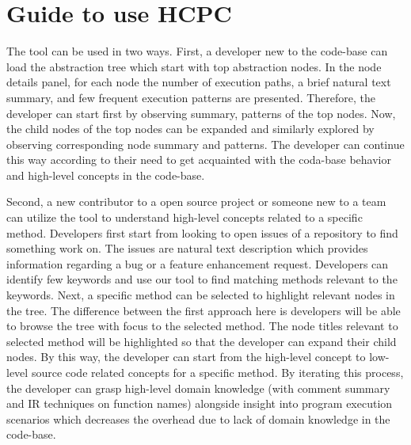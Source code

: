 \section{Guide to use HCPC}
\label{hla3:use_guide}
The tool can be used in two ways. First, a developer new to the code-base can load the abstraction tree which start with top abstraction  nodes. In the node details panel, for each node the number of execution paths, a brief natural text summary, and few frequent execution patterns are presented. Therefore, the developer can start first by observing summary, patterns of the top nodes. Now, the child nodes of the top nodes can be expanded and  similarly explored by observing corresponding node summary and patterns. The developer can continue this way according to their need to get acquainted with the coda-base behavior and high-level concepts in the code-base.

Second, a new contributor to a open source project or someone new to a team can utilize the tool to understand high-level concepts related to a specific method. Developers first start from looking to open issues of a repository to find something work on. The issues are natural text description which provides information regarding a bug or a feature enhancement request. Developers can identify few keywords and use our tool to find matching methods relevant to the keywords. Next, a specific method can be selected to highlight relevant nodes in the tree. The difference between the first approach here is developers will be able to browse the tree with focus to the selected method. The node titles relevant to selected method will be highlighted so that the developer can expand their child nodes. By this way, the developer can start from the high-level concept to low-level source code related concepts for a specific method. By iterating this process, the developer can grasp high-level domain knowledge (with comment summary and IR techniques on function names) alongside insight into program execution scenarios which decreases the overhead due to lack of domain knowledge in the code-base. 

